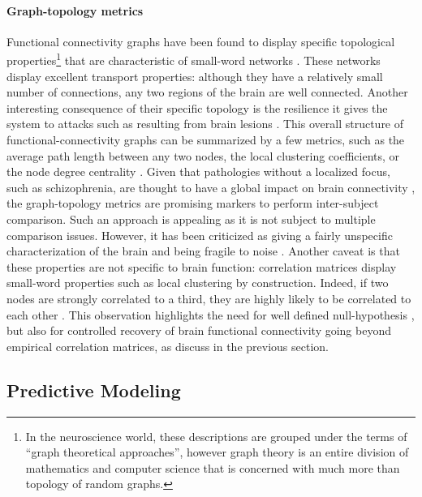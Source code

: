 \documentclass[5p]{elsarticle}
\begin{document}
\paragraph{Graph-topology metrics}
%
Functional connectivity graphs have been found to display specific
topological properties\footnote{In the neuroscience world, these
descriptions are grouped under the terms of ``graph theoretical
approaches'', however graph theory is an entire division of mathematics
and computer science that is concerned with much more than topology of
random graphs.} that are characteristic of small-word networks
\cite{stam2004,salvador2005,achard2006,bullmore2009}. These networks
display excellent transport properties: although they have a relatively
small number of connections, any two regions of the brain are well
connected. 
Another interesting consequence of their specific topology is
the resilience it gives the system to attacks such as resulting from
brain lesions \cite{achard2006}. This overall structure of
functional-connectivity graphs can be summarized by a few metrics, such
as the average path length between any two nodes, the local clustering
coefficients, or the node degree centrality \cite{rubinov2010}. Given that pathologies without a
localized focus, such
as schizophrenia, are thought to have a global impact on brain
connectivity \cite{liu2008,bassett2008}, the graph-topology metrics are
promising markers to perform inter-subject comparison. Such an
approach is appealing as it is not subject to multiple comparison issues.
However, it has been criticized as giving a fairly unspecific
characterization of the brain and being fragile to noise
\cite{ioannides2007}. Another caveat is that these properties are not
specific to brain function: correlation matrices display
small-word properties such as local clustering by construction. Indeed, if two
nodes are strongly correlated to a third, they are highly likely to be
correlated to each other \cite{zalesky2012}. This observation highlights
the need for well defined null-hypothesis \cite{zalesky2012,rubinov2011},
but also for controlled recovery of brain functional connectivity going
beyond empirical correlation matrices, as discuss in the previous section.


\subsection{Predictive Modeling}
\end{document}
